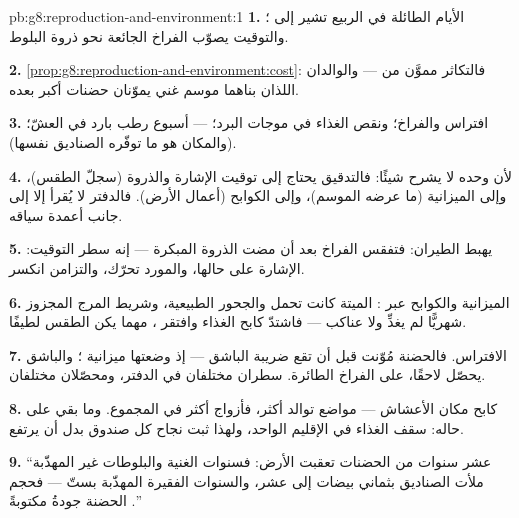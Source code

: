 \begin{solution}{pb:g8:reproduction-and-environment:1}
\textbf{1.} الأيام الطائلة في الربيع تشير إلى ؛ والتوقيت
يصوّب الفراخ الجائعة نحو ذروة  البلوط.

\textbf{2.} \cref{prop:g8:reproduction-and-environment:cost}:
فالتكاثر مموَّن من  --- والوالدان اللذان بناهما موسم غني
يموّنان حضنات أكبر بعده.

\textbf{3.} افتراس  والفراخ؛ ونقص الغذاء في موجات البرد؛
 --- أسبوع رطب بارد في العشّ؛ (والمكان هو ما توفّره
الصناديق نفسها).

\textbf{4.} لأن  وحده لا يشرح شيئًا: فالتدقيق يحتاج إلى
توقيت الإشارة والذروة (سجلّ الطقس)، وإلى الميزانية (ما عرضه
الموسم)، وإلى الكوابح  (أعمال الأرض). فالدفتر لا يُقرأ إلا
إلى جانب أعمدة سياقه.

\textbf{5.} يهبط الطيران: فتفقس الفراخ بعد أن مضت الذروة المبكرة
--- إنه سطر التوقيت: الإشارة على حالها، والمورد تحرّك، والتزامن
انكسر.

\textbf{6.} الميزانية والكوابح عبر :  الميتة كانت
تحمل  والجحور الطبيعية، وشريط المرج المجزوز شهريًّا لم يغذِّ
 ولا عناكب --- فاشتدّ كابح الغذاء وافتقر ، مهما يكن
الطقس لطيفًا.

\textbf{7.} الافتراس. فالحضنة مُوّنت قبل أن تقع ضريبة الباشق ---
إذ وضعتها ميزانية ؛ والباشق يحصّل لاحقًا، على الفراخ
الطائرة. سطران مختلفان في الدفتر، ومحصّلان مختلفان.

\textbf{8.} كابح مكان الأعشاش --- مواضع توالد أكثر، فأزواج أكثر
في المجموع. وما بقي على حاله: سقف الغذاء في الإقليم الواحد، ولهذا
ثبت نجاح كل صندوق بدل أن يرتفع.

\textbf{9.} ``عشر سنوات من الحضنات تعقبت الأرض: فسنوات 
الغنية والبلوطات غير المهذّبة ملأت الصناديق بثماني بيضات إلى عشر،
والسنوات الفقيرة المهذّبة بستّ --- فحجم الحضنة جودةُ  مكتوبةً
.''


\end{solution}
